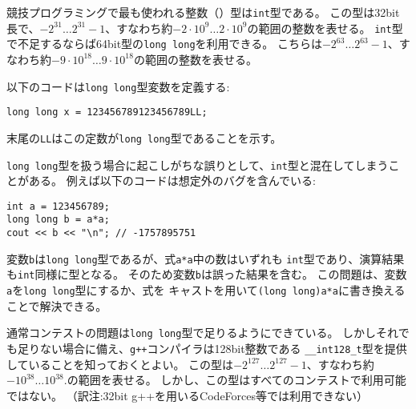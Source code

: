 競技プログラミングで最も使われる整数（）型は\texttt{int}型である。
この型は32bit長で、$-2^{31} \ldots 2^{31}-1$、すなわち約$-2 \cdot 10^9 \ldots 2 \cdot 10^9$の範囲の整数を表せる。
\texttt{int}型で不足するならば64bit型の\texttt{long long}を利用できる。
こちらは$-2^{63} \ldots 2^{63}-1$、すなわち約$-9 \cdot 10^{18} \ldots 9 \cdot 10^{18}$の範囲の整数を表せる。

以下のコードは\texttt{long long}型変数を定義する:
\begin{lstlisting}
long long x = 123456789123456789LL;
\end{lstlisting}
末尾の\texttt{LL}はこの定数が\texttt{long long}型であることを示す。

\texttt{long long}型を扱う場合に起こしがちな誤りとして、\texttt{int}型と混在してしまうことがある。
例えば以下のコードは想定外のバグを含んでいる:

\begin{lstlisting}
int a = 123456789;
long long b = a*a;
cout << b << "\n"; // -1757895751
\end{lstlisting}

\begin{comment}
Even though the variable \texttt{b} is of type \texttt{long long},
both numbers in the expression \texttt{a*a}
are of type \texttt{int} and the result is
also of type \texttt{int}.
Because of this, the variable \texttt{b} will
contain a wrong result.
The problem can be solved by changing the type
of \texttt{a} to \texttt{long long} or
by changing the expression to \texttt{(long long)a*a}.

Usually contest problems are set so that the
type \texttt{long long} is enough.
Still, it is good to know that
the \texttt{g++} compiler also provides
a 128-bit type \texttt{\_\_int128\_t}
with a value range of
$-2^{127} \ldots 2^{127}-1$ or about $-10^{38} \ldots 10^{38}$.
However, this type is not available in all contest systems.
\end{comment}

変数\texttt{b}は\texttt{long long}型であるが、式\texttt{a*a}中の数はいずれも
\texttt{int}型であり、演算結果も\texttt{int}同様に型となる。
そのため変数\texttt{b}は誤った結果を含む。
この問題は、変数\texttt{a}を\texttt{long long}型にするか、式を
キャストを用いて\texttt{(long long)a*a}に書き換えることで解決できる。

通常コンテストの問題は\texttt{long long}型で足りるようにできている。
しかしそれでも足りない場合に備え、\texttt{g++}コンパイラは128bit整数である
\texttt{\_\_int128\_t}型を提供していることを知っておくとよい。
この型は$-2^{127} \ldots 2^{127}-1$、すなわち約$-10^{38} \ldots 10^{38}$.の範囲を表せる。
しかし、この型はすべてのコンテストで利用可能ではない。
（訳注:32bit g++を用いるCodeForces等では利用できない）

